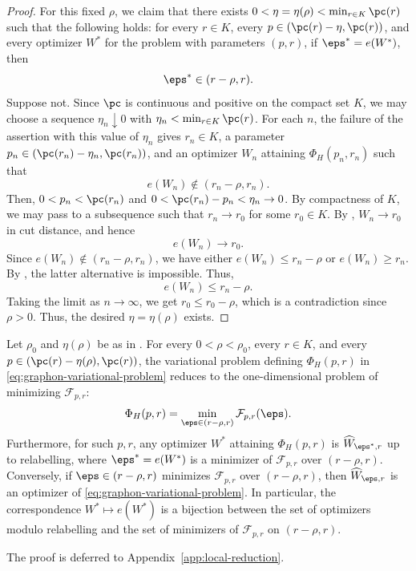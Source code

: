 \begin{proof}
For this fixed $\rho$, we claim that there exists
$0<\eta=\eta(\rho)<\min_{r\in K}\pc(r)$ such that the following holds: for
every $r\in K$, every $p\in(\pc(r)-\eta,\pc(r))$, and every optimizer $W^*$
for the problem with parameters $(p,r)$, if $\eps^*=e(W^*)$, then
\begin{equation}\label{eq:edge-density-localization}
  \eps^* \in (r-\rho,r).
\end{equation}
Suppose not.  Since $\pc$ is continuous and positive on the compact set $K$,
we may choose a sequence $\eta_n\downarrow0$ with
$\eta_n<\min_{r\in K}\pc(r)$.  For each $n$, the failure of the assertion with
this value of $\eta_n$ gives $r_n\in K$, a parameter
$p_n\in(\pc(r_n)-\eta_n,\pc(r_n))$, and an optimizer $W_n$ attaining
$\Phi_H(p_n,r_n)$ such that
\[
  e(W_n) \notin (r_n-\rho,r_n).
\]
Then, $0<p_n<\pc(r_n)$ and $0<\pc(r_n)-p_n<\eta_n\to0$.
By compactness of $K$, we may pass to a subsequence such that $r_n \to r_0$
for some $r_0 \in K$.
By , $W_n \to r_0$ in cut distance, and hence
\[
  e(W_n) \to r_0.
\]
Since $e(W_n) \notin (r_n-\rho,r_n)$, we have either
$e(W_n) \le r_n - \rho$ or $e(W_n) \ge r_n$.
By , the latter alternative is impossible.  Thus,
\[
  e(W_n) \le r_n - \rho.
\]
Taking the limit as $n \to \infty$, we get $r_0 \le r_0 - \rho$, which is a
contradiction since $\rho > 0$.
Thus, the desired $\eta=\eta(\rho)$ exists.
\end{proof}

\begin{corollary}\label{cor:scalar-reduction}
Let $\rho_0$ and $\eta(\rho)$ be as in
.  For every $0<\rho<\rho_0$, every
$r\in K$, and every $p\in(\pc(r)-\eta(\rho),\pc(r))$, the variational problem
defining $\Phi_H(p,r)$ in \eqref{eq:graphon-variational-problem} reduces to the
one-dimensional problem of minimizing $\mathcal{F}_{p,r}$:
\begin{equation}\label{eq:edge-density-minimization}
  \Phi_H(p,r)=
  \min_{\eps\in(r-\rho,r)}\mathcal F_{p,r}(\eps).
\end{equation}
Furthermore, for such $p,r$, any optimizer $W^*$ attaining $\Phi_H(p,r)$
is $\widehat W_{\eps^*,r}$ up to relabelling, where $\eps^*=e(W^*)$ is a minimizer of
$\mathcal F_{p,r}$ over $(r-\rho,r)$.  Conversely, if
$\eps\in(r-\rho,r)$ minimizes $\mathcal F_{p,r}$ over $(r-\rho,r)$, then
$\widehat W_{\eps,r}$ is an optimizer of \eqref{eq:graphon-variational-problem}.  In
particular, the correspondence $W^*\mapsto e(W^*)$ is a bijection between the
set of optimizers modulo relabelling and the set of minimizers of
$\mathcal F_{p,r}$ on $(r-\rho,r)$.
\end{corollary}

The proof is deferred to Appendix~\ref{app:local-reduction}.